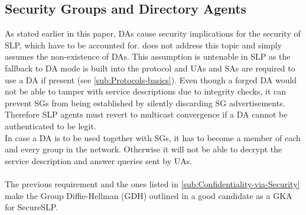 \subsection{Security Groups and Directory Agents}
As stated earlier in this paper, DAs cause security implications for the security of SLP, which have to be accounted for. \citet{Hollick2001} does not address this topic and simply assumes the non-existence of DAs. This assumption is untenable in SLP as the fallback to DA mode is built into the protocol and UAs and SAs are required to use a DA if present (see \ref{sub:Protocols-basics}). Even though a forged DA would not be able to tamper with service descriptions due to integrity checks, it can prevent SGs from being established by silently discarding SG advertisements. Therefore SLP agents must revert to multicast convergence if a DA cannot be authenticated to be legit.\\
In case a DA is to be used together with SGs, it has to become a member of each and every group in the network. Otherwise it will not be able to decrypt the service description and answer queries sent by UAs.\\\\
The previous requirement and the ones listed in \ref{sub:Confidentiality-via-Security} make the Group Diffie-Hellman (GDH) outlined in \citet{Bhaskar2007} a good candidate as a GKA for SecureSLP.